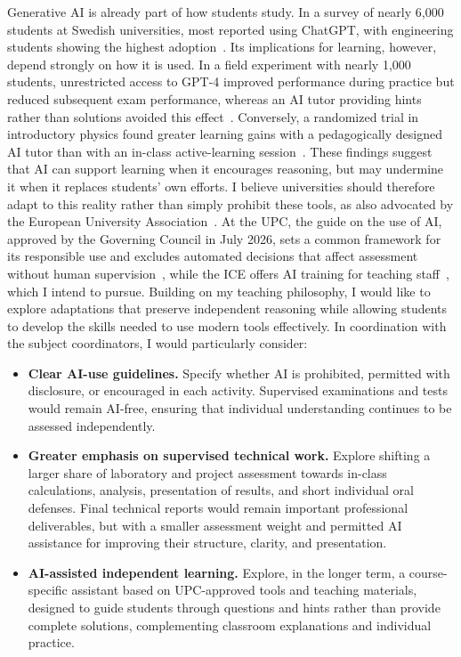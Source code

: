 \documentclass[11pt]{article}
\begin{document}
Generative AI is already part of how students study. 
In a survey of nearly 6,000 students at Swedish universities, most reported using ChatGPT, with engineering students showing the highest adoption~\cite{Stohr2024}. 
Its implications for learning, however, depend strongly on how it is used. 
In a field experiment with nearly 1,000 students, unrestricted access to GPT-4 improved performance during practice but reduced subsequent exam performance, whereas an AI tutor providing hints rather than solutions avoided this effect~\cite{Bastani2025}. 
Conversely, a randomized trial in introductory physics found greater learning gains with a pedagogically designed AI tutor than with an in-class active-learning session~\cite{Kestin2025}. 
These findings suggest that AI can support learning when it encourages reasoning, but may undermine it when it replaces students' own efforts.
I believe universities should therefore adapt to this reality rather than simply prohibit these tools, as also advocated by the European University Association~\cite{EUA2023}.
At the UPC, the guide on the use of AI, approved by the Governing Council in July 2026, sets a common framework for its responsible use and excludes automated decisions that affect assessment without human supervision~\cite{UPCAI2026}, while the ICE offers AI training for teaching staff~\cite{UPCAITeach}, which I intend to pursue.
Building on my teaching philosophy, I would like to explore adaptations that preserve independent reasoning while allowing students to develop the skills needed to use modern tools effectively. 
In coordination with the subject coordinators, I would particularly consider:
\begin{itemize}
	\item \textbf{Clear AI-use guidelines.} Specify whether AI is prohibited, permitted with disclosure, or encouraged in each activity. Supervised examinations and tests would remain AI-free, ensuring that individual understanding continues to be assessed independently.
	
	\item \textbf{Greater emphasis on supervised technical work.} Explore shifting a larger share of laboratory and project assessment towards in-class calculations, analysis, presentation of results, and short individual oral defenses. Final technical reports would remain important professional deliverables, but with a smaller assessment weight and permitted AI assistance for improving their structure, clarity, and presentation.
	
	\item \textbf{AI-assisted independent learning.} Explore, in the longer term, a course-specific assistant based on UPC-approved tools and teaching materials, designed to guide students through questions and hints rather than provide complete solutions, complementing classroom explanations and individual practice.
\end{itemize}
\end{document}
